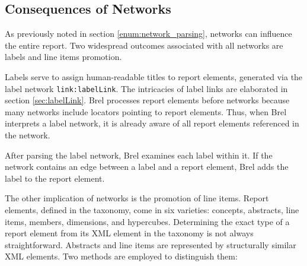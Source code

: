 


\subsection{Consequences of Networks}

As previously noted in section \ref{enum:network_parsing}, networks can influence the entire report.
Two widespread outcomes associated with all networks are labels and line items promotion.

Labels serve to assign human-readable titles to report elements, generated via the label network \texttt{link:labelLink}.
The intricacies of label links are elaborated in section \ref{sec:labelLink}.
Brel processes report elements before networks because many networks include locators pointing to report elements.
Thus, when Brel interprets a label network, it is already aware of all report elements referenced in the network.

After parsing the label network, Brel examines each label within it.
If the network contains an edge between a label and a report element, Brel adds the label to the report element.

The other implication of networks is the promotion of line items.
Report elements, defined in the taxonomy, come in six varieties: concepts, abstracts, line items, members, dimensions, and hypercubes.
Determining the exact type of a report element from its XML element in the taxonomy is not always straightforward.
Abstracts and line items are represented by structurally similar XML elements.
Two methods are employed to distinguish them:

